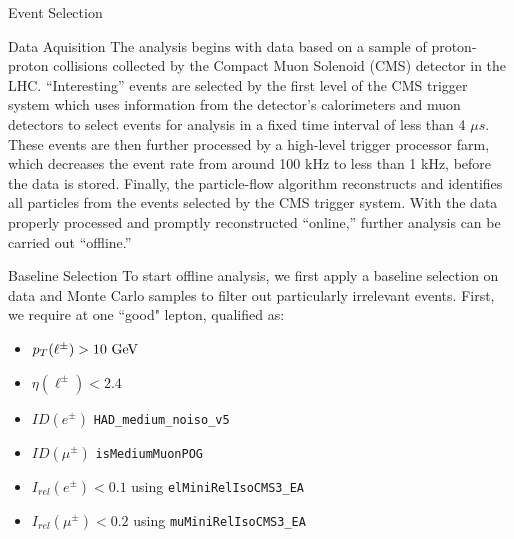 \begin{section}{Event Selection}
\begin{subsection}{Data Aquisition}\label{data-aquisition}
The analysis begins with data based on a sample of proton-proton collisions collected by the Compact Muon Solenoid (CMS) detector in the LHC. ``Interesting'' events are selected by the first level of the CMS trigger system which uses information from the detector's calorimeters and muon detectors to select events for analysis in a fixed time interval of less than 4 $\mu s$. These events are then further processed by a high-level trigger processor farm, which decreases the event rate from around 100 kHz to less than 1 kHz, before the data is stored. Finally, the particle-flow algorithm reconstructs and identifies all particles from the events selected by the CMS trigger system. With the data properly processed and promptly reconstructed ``online,'' further analysis can be carried out ``offline.''
\end{subsection}
\begin{subsection}{Baseline Selection}\label{baseline-selection}
To start offline analysis, we first apply a baseline selection on data and Monte Carlo samples to filter out particularly irrelevant events. First, we require at one ``good" lepton, qualified as:
\begin{itemize}
    \item $p_{T}(\ell^{\pm}) > 10\textnormal{ GeV}$
    \item $\eta(\ell^{\pm}) < 2.4$
    \item $ID(e^{\pm})$ \verb|HAD_medium_noiso_v5|
    \item $ID(\mu^{\pm})$ \verb|isMediumMuonPOG|
    \item $I_{rel}(e^{\pm}) < 0.1$ using \verb|elMiniRelIsoCMS3_EA|
    \item $I_{rel}(\mu^{\pm}) < 0.2$ using \verb|muMiniRelIsoCMS3_EA|
\end{itemize}


\end{subsection}
\end{section}
